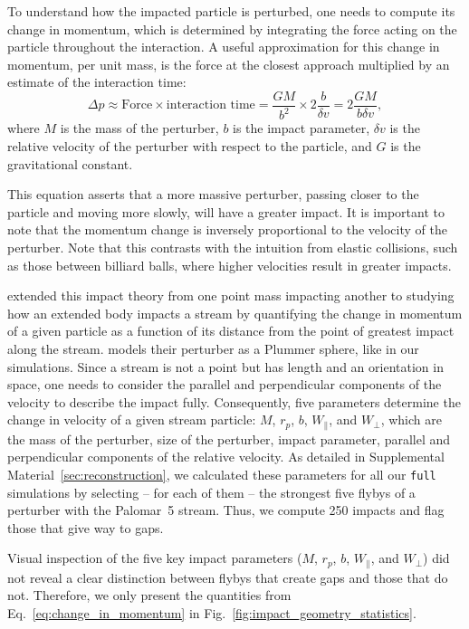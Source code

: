         To understand how the impacted particle is perturbed, one needs to compute its change in momentum, which is determined by integrating the force acting on the particle throughout the interaction. A useful approximation for this change in momentum, per unit mass, is the force at the closest approach multiplied by an estimate of the interaction time:
        \begin{equation} \label{eq:change_in_momentum} \Delta p \approx \text{Force} \times \text{interaction time} = \frac{GM}{b^2} \times 2\frac{b}{\delta v} = 2\frac{GM}{b \delta v}, \end{equation}where $M$ is the mass of the perturber, $b$ is the impact parameter, $\delta v$ is the relative velocity of the perturber with respect to the particle, and $G$ is the gravitational constant. 

        This equation asserts that a more massive perturber, passing closer to the particle and moving more slowly, will have a greater impact. It is important to note that the momentum change is inversely proportional to the velocity of the perturber. Note that this contrasts with the intuition from elastic collisions, such as those between billiard balls, where higher velocities result in greater impacts.

        \citet{2015MNRAS.450.1136E} extended this impact theory from one point mass impacting another to studying how an extended body impacts a stream by quantifying the change in momentum of a given particle as a function of its distance from the point of greatest impact along the stream. \citet{2015MNRAS.450.1136E} models their perturber as a Plummer sphere, like in our simulations. Since a stream is not a point but has length and an orientation in space, one needs to consider the parallel and perpendicular components of the velocity to describe the impact fully. Consequently, five parameters determine the change in velocity of a given stream particle: $M$, $r_p$, $b$, $W_\parallel$, and $W_\perp$, which are the mass of the perturber, size of the perturber, impact parameter, parallel and perpendicular components of the relative velocity. As detailed in Supplemental Material~\ref{sec:reconstruction}, we calculated these parameters for all our \texttt{full} simulations by selecting -- for each of them --  the strongest five flybys of a perturber with the Palomar~5 stream. Thus, we compute 250 impacts and flag those that give way to gaps. 

        Visual inspection of the five key impact parameters ($M$, $r_p$, $b$, $W_\parallel$, and $W_\perp$) did not reveal a clear distinction between flybys that create gaps and those that do not. Therefore, we only present the quantities from Eq.~\ref{eq:change_in_momentum} in Fig.~\ref{fig:impact_geometry_statistics}. 
    
